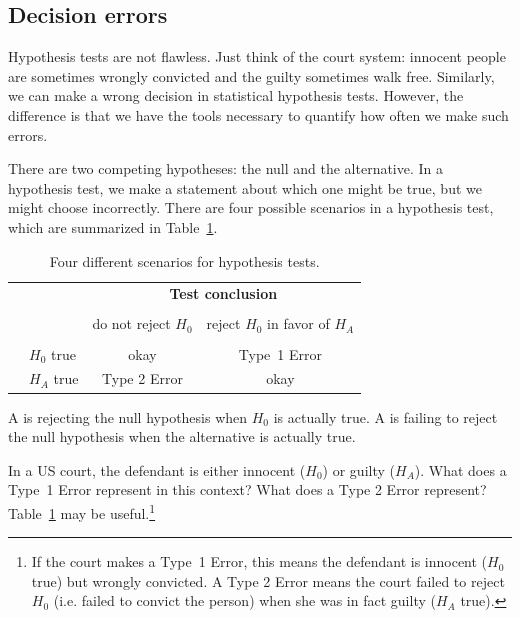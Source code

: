 \subsection{Decision errors}\label{DecisionErrors}


Hypothesis tests are not flawless. Just think of the court system: innocent people are sometimes wrongly convicted and the guilty sometimes walk free. Similarly, we can make a wrong decision in statistical hypothesis tests. However, the difference is that we have the tools necessary to quantify how often we make such errors.

There are two competing hypotheses: the null and the alternative. In a hypothesis test, we make a statement about which one might be true, but we might choose incorrectly. There are four possible scenarios in a hypothesis test, which are summarized in Table~\ref{fourHTScenarios}.

\begin{table}[ht]
\centering
\begin{tabular}{l l c c}
& & \multicolumn{2}{c}{\textbf{Test conclusion}} \\
  \cline{3-4}
\vspace{-3.7mm} \\
& & do not reject $H_0$ &  reject $H_0$ in favor of $H_A$ \\
  \cline{2-4}
\vspace{-3.7mm} \\
& $H_0$ true & okay &  Type~1 Error \\
\raisebox{1.5ex}{\textbf{Truth}} & $H_A$ true & Type 2 Error & okay \\
  \cline{2-4}
\end{tabular}
\caption{Four different scenarios for hypothesis tests.}
\label{fourHTScenarios}
\end{table}

A  is rejecting the null hypothesis when $H_0$ is actually true. A  is failing to reject the null hypothesis when the alternative is actually true.

\begin{exercise} \label{whatAreTheErrorTypesInUSCourts}
In a US court, the defendant is either innocent ($H_0$) or  guilty ($H_A$). What does a Type~1 Error represent in this context? What does a Type 2 Error represent? Table~\ref{fourHTScenarios} may be useful.\footnote{If the court makes a Type~1 Error, this means the defendant is innocent ($H_0$ true) but wrongly convicted. A Type 2 Error means the court failed to reject $H_0$ (i.e. failed to convict the person) when she was in fact guilty ($H_A$ true).}
\end{exercise}

